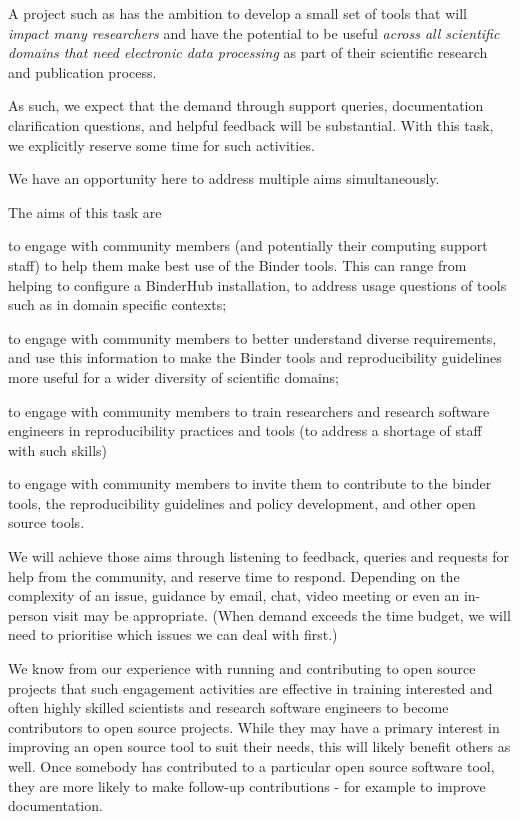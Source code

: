 \begin{task}[
  title=Community support and engagement,
  id=community-support,
  lead=SRL,
  PM=13,
  wphases={0-36!.36},
  partners={MP,QS,UIO,IFR}
]
A project such as \TheProject{} has the ambition to develop a small set of tools
that will \emph{impact many researchers} and have the potential to be useful
\emph{across all scientific domains that need electronic data processing} as part of their
scientific research and publication process.

As such, we expect that the demand through support queries, documentation
clarification questions, and helpful feedback will be substantial. With this
task, we explicitly reserve some time for such activities.

We have an opportunity here to address multiple aims simultaneously.

The aims of this task are
\begin{compactitem}
\item to engage with community members (and potentially their computing support
  staff) to help them make best use of the Binder tools. This can range from
  helping to configure a BinderHub installation, to address usage questions of
  tools such as \repotodocker{} in domain specific contexts;
\item to engage with community members to better understand diverse
  requirements, and use this information to make the Binder tools and
  reproducibility guidelines more useful for a wider diversity of scientific
  domains;
\item to engage with community members to train researchers and research
  software engineers in reproducibility practices and tools (to address a
  shortage of staff with such skills)
\item to engage with community members to invite them to contribute to the
  binder tools, the reproducibility guidelines and policy development, and other
  open source tools.
\end{compactitem}

We will achieve those aims through listening to feedback, queries and requests
for help from the community, and reserve time to respond. Depending on the
complexity of an issue, guidance by email, chat, video meeting or even an
in-person visit may be appropriate. (When demand exceeds the time budget, we
will need to prioritise which issues we can deal with first.)

We know from our experience with running and contributing to open source
projects that such engagement activities are effective in training interested
and often highly skilled scientists and research software engineers to become
contributors to open source projects. While they may have a primary interest in
improving an open source tool to suit their needs, this will likely benefit
others as well. Once somebody has contributed to a particular open source
software tool, they are more likely to make follow-up contributions - for
example to improve documentation.

\end{task}
